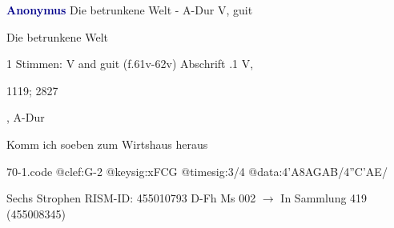 \documentclass[twocolumn]{book}
\begin{document}
\newline \par \vspace{7pt} \textcolor{darkblue}{\textbf{Anonymus  }}
\newline Die betrunkene Welt - A-Dur
\newline V, guit
\newline \begin{itshape}[heading, f.61v:] Die betrunkene Welt\end{itshape} 
\newline \textcolor{darkblue}{}  1 Stimmen: V and guit  (f.61v-62v)
\newline Abschrift
.1  V, \begin{itshape}1119; 2827\end{itshape}, A-Dur
\newline \begin{footnotesize} Komm ich soeben zum Wirtshaus heraus \end{footnotesize}  
\begin{filecontents*}{70-1.code}
@clef:G-2
@keysig:xFCG
@timesig:3/4
@data:4'A{8AG}{AB}/4''C'AE/
\end{filecontents*}
\newline
%
\newline Sechs Strophen
\newline RISM-ID: 455010793
\newline D-Fh  Ms 002
\newline $\rightarrow$ In Sammlung 419 (455008345)
      
\end{document}

